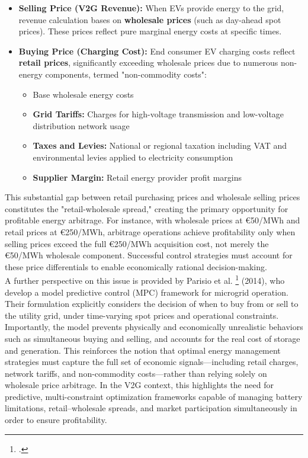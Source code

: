 \begin{itemize}
    \item \textbf{Selling Price (V2G Revenue):} When EVs provide energy to the grid, revenue calculation bases on \textbf{wholesale prices} (such as day-ahead spot prices). These prices reflect pure marginal energy costs at specific times.
    
    \item \textbf{Buying Price (Charging Cost):} End consumer EV charging costs reflect \textbf{retail prices}, significantly exceeding wholesale prices due to numerous non-energy components, termed "non-commodity costs":
    \begin{itemize}
        \item Base wholesale energy costs
        \item \textbf{Grid Tariffs:} Charges for high-voltage transmission and low-voltage distribution network usage
        \item \textbf{Taxes and Levies:} National or regional taxation including VAT and environmental levies applied to electricity consumption
        \item \textbf{Supplier Margin:} Retail energy provider profit margins
    \end{itemize}
\end{itemize}
\noindent
This substantial gap between retail purchasing prices and wholesale selling prices constitutes the "retail-wholesale spread," creating the primary opportunity for profitable energy arbitrage. For instance, with wholesale prices at €50/MWh and retail prices at €250/MWh, arbitrage operations achieve profitability only when selling prices exceed the full €250/MWh acquisition cost, not merely the €50/MWh wholesale component. Successful control strategies must account for these price differentials to enable economically rational decision-making.
\noindent
\\
A further perspective on this issue is provided by Parisio et al. 
\footcite{parisio2014mpc}
(2014), who develop a model predictive control (MPC) framework for microgrid operation. Their formulation explicitly considers the decision of when to buy from or sell to the utility grid, under time-varying spot prices and operational constraints. Importantly, the model prevents physically and economically unrealistic behaviors such as simultaneous buying and selling, and accounts for the real cost of storage and generation. This reinforces the notion that optimal energy management strategies must capture the full set of economic signals—including retail charges, network tariffs, and non-commodity costs—rather than relying solely on wholesale price arbitrage. In the V2G context, this highlights the need for predictive, multi-constraint optimization frameworks capable of managing battery limitations, retail–wholesale spreads, and market participation simultaneously in order to ensure profitability.
\newpage
